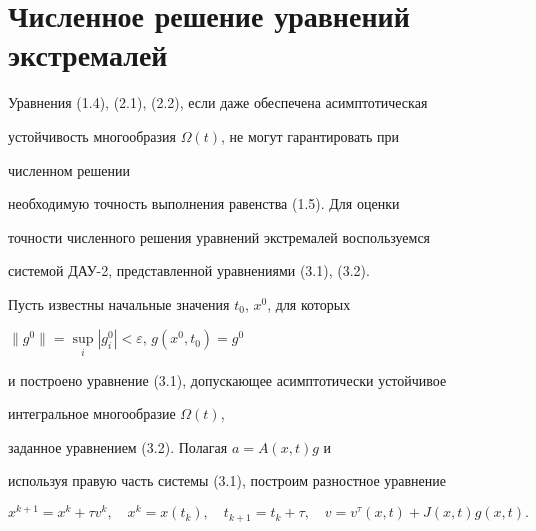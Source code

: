 


\section{Численное решение уравнений экстремалей} 


 


Уравнения (1.4), (2.1), (2.2), если даже обеспечена асимптотическая 


устойчивость многообразия $\Omega(t)$, не могут гарантировать при 


численном решении 


необходимую точность выполнения равенства (1.5). Для оценки 


точности численного решения уравнений экстремалей воспользуемся 


системой ДАУ-2, представленной уравнениями (3.1), (3.2). 


 


Пусть известны начальные значения $t_0$, $x^0$, для которых 


$\|g^0\|=\sup\limits_i |g^0_i|<\varepsilon$, $g(x^0,t_0)=g^0$ 


и построено уравнение (3.1), допускающее асимптотически устойчивое 


интегральное многообразие $\Omega(t)$, 


заданное уравнением (3.2). Полагая $a=A(x,t)g$ и 


используя правую часть системы (3.1), построим разностное уравнение 


\begin{equation} 


x^{k+1}=x^k+\tau v^k,\quad x^k=x(t_k),\quad t_{k+1}=t_k+\tau, 


\quad v=v^\tau(x,t)+J(x,t)g(x,t). 


\end{equation} 


 


